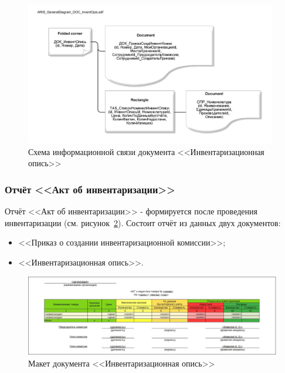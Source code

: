 \begin{figure}[!h]
    \centering

    \includegraphics[width=11cm]
    {assets/ARIS/ARIS_GeneralDiagram_DOC_InventOpis.adf.pdf}

    \caption{Схема информационной связи документа <<Инвентаризационная опись>>}

    \label{fig:ARIS_GeneralDiagram_DOC_InventOpis}
\end{figure}

\newpage
\subsubsection{Отчёт <<Акт об инвентаризации>>}

Отчёт <<Акт об инвентаризации>>
- формируется после проведения инвентаризации (см. рисунок~\ref{fig:OTC_ActNedoctachiTovara}).
Состоит отчёт из данных двух документов:
\begin{itemize}
    \item <<Приказ о создании инвентаризационной комиссии>>;
    \item <<Инвентаризационная опись>>.
\end{itemize}

\begin{figure}[!h]
    \centering

    \includegraphics[width=17cm]
    {assets/layouts/OTC_ActNedoctachiTovara.jpg}

    \caption{Макет документа <<Инвентаризационная опись>>}
    
    \label{fig:OTC_ActNedoctachiTovara}
\end{figure}

